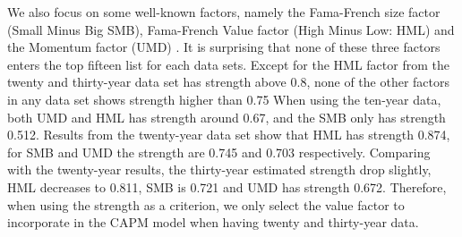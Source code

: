 

We also focus on some well-known factors, namely the Fama-French size factor (Small Minus Big SMB), Fama-French Value factor (High Minus Low: HML) \cite{Fama1992} and the Momentum factor (UMD) \cite{Carhart1997}.
It is surprising that none of these three factors enters the top fifteen list for each data sets.
Except for the HML factor from the twenty and thirty-year data set has strength above 0.8, none of the other factors in any data set shows strength higher than 0.75
When using the ten-year data, both UMD and HML has strength around 0.67, and the SMB only has strength 0.512.
Results from the twenty-year data set show that HML has strength 0.874, for SMB and UMD the strength are 0.745 and 0.703 respectively.
Comparing with the twenty-year results, the thirty-year estimated strength drop slightly, HML decreases to 0.811, SMB is 0.721 and UMD has strength 0.672.
Therefore, when using the strength as a criterion, we only select the value factor to incorporate in the CAPM model when having twenty and thirty-year data.


